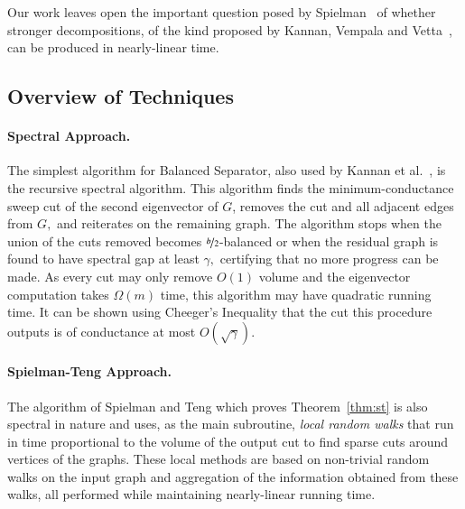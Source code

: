 \documentclass[twoside,leqno,twocolumn]{article}
\newcommand{\nfrac}{\nicefrac}
\newcommand{\BS}{{\sc Balanced Separator}\xspace}
\numberwithin{equation}{section}
\begin{document}
Our work leaves open the important question posed by Spielman~\cite{SpielmanICM} of whether stronger decompositions, of the kind proposed by Kannan, Vempala and Vetta~\cite{Kannan}, can be produced in nearly-linear time.




\subsection{Overview of Techniques}
\paragraph{Spectral Approach.}
The simplest algorithm for \BS, also used by Kannan et al.~\cite{Kannan}, is the recursive spectral algorithm. 
This algorithm finds the minimum-conductance sweep cut of the second eigenvector of $G$,  removes the cut and all adjacent edges from $G,$ and reiterates on the remaining graph. The algorithm stops when the union of the cuts removed becomes $\nfrac{b}{2}$-balanced or when the residual graph is found to have spectral gap at least $\gamma,$ certifying that no more progress can be made. As every cut may only remove $O(1)$ volume  and the eigenvector computation takes $\Omega(m)$ time, this algorithm may have quadratic running time. It can be shown using Cheeger's Inequality \cite{FAN} that the cut this procedure outputs is of conductance at most $O(\sqrt{\gamma}).$ 
\paragraph{Spielman-Teng Approach.}
The algorithm of Spielman and Teng which proves Theorem~\ref{thm:st} is also spectral in nature and  uses, as the main subroutine, {\it local random walks} that run in time proportional to the volume of the output cut to find sparse cuts around vertices of the graphs. These local methods are based on  non-trivial random walks on the input graph and aggregation of the information obtained from these walks, all performed while maintaining  nearly-linear running time.
\end{document}
